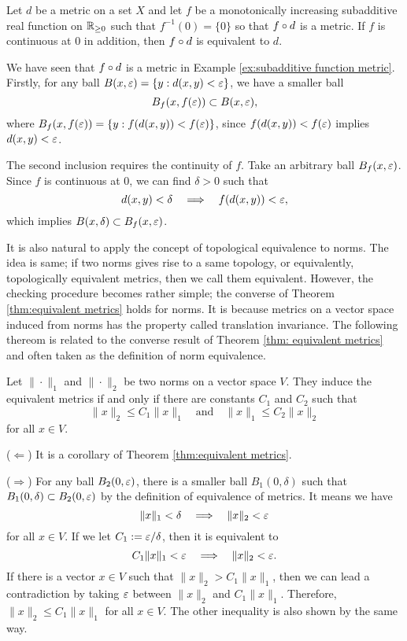 \documentclass{../crs}
\begin{document}
\begin{thm}\label{thm:subadditive equivalent metrics}
Let $d$ be a metric on a set $X$ and let $f$ be a monotonically increasing subadditive real function on $\mathbb{R}_{\ge0}$ such that $f^{-1}(0)=\{0\}$ so that $f\circ d$ is a metric.
If $f$ is continuous at 0 in addition, then $f\circ d$ is equivalent to $d$.
\end{thm}
\begin{pf}
We have seen that $f\circ d$ is a metric in Example \ref{ex:subadditive function metric}.
Firstly, for any ball $B(x,\varepsilon)=\{y:d(x,y)<\varepsilon\}$, we have a smaller ball
\[B_f(x,f(\varepsilon))\subset B(x,\varepsilon),\]
where $B_f(x,f(\varepsilon))=\{y:f(d(x,y))<f(\varepsilon)\}$, since $f(d(x,y))<f(\varepsilon)$ implies $d(x,y)<\varepsilon$.

The second inclusion requires the continuity of $f$.
Take an arbitrary ball $B_f(x,\varepsilon)$.
Since $f$ is continuous at 0, we can find $\delta>0$ such that
\[d(x,y)<\delta\impl f(d(x,y))<\e,\]
which implies $B(x,\delta)\subset B_f(x,\varepsilon)$.
\end{pf}


It is also natural to apply the concept of topological equivalence to norms.
The idea is same; if two norms gives rise to a same topology, or equivalently, topologically equivalent metrics, then we call them equivalent.
However, the checking procedure becomes rather simple; the converse of Theorem \ref{thm:equivalent metrics} holds for norms.
It is because metrics on a vector space induced from norms has the property called translation invariance.
The following thereom is related to the converse result of Theorem \ref{thm: equivalent metrics} and often taken as the definition of norm equivalence.

\begin{thm}
Let $\|\cdot\|_1$ and $\|\cdot\|_2$ be two norms on a vector space $V$.
They induce the equivalent metrics if and only if there are constants $C_1$ and $C_2$ such that
\[\|x\|_2\le C_1\|x\|_1\quad\text{and}\quad\|x\|_1\le C_2\|x\|_2\]
for all $x\in V$.
\end{thm}
\begin{pf}
($\Leftarrow$) It is a corollary of Theorem \ref{thm:equivalent metrics}.

($\Rightarrow$)
For any ball $B_2(0,\varepsilon)$, there is a smaller ball $B_1(0,\delta)$ such that $B_1(0,\delta)\subset B_2(0,\varepsilon)$ by the definition of equivalence of metrics.
It means we have
\[\|x\|_1<\delta\impl\|x\|_2<\e\]
for all $x\in V$.
If we let $C_1:=\varepsilon/\delta$, then it is equivalent to
\[C_1\|x\|_1<\e\impl\|x\|_2<\e.\]
If there is a vector $x\in V$ such that $\|x\|_2>C_1\|x\|_1$, then we can lead a contradiction by taking $\varepsilon$ between $\|x\|_2$ and $C_1\|x\|_1$.
Therefore, $\|x\|_2\le C_1\|x\|_1$ for all $x\in V$.
The other inequality is also shown by the same way.
\end{pf}
\end{document}
